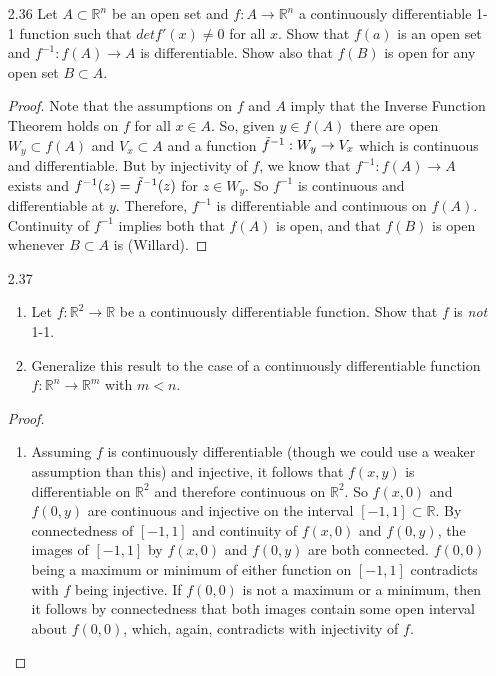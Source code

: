 \begin{enumerate}
    \item[2.36] Let \( A \subset \mathbb{R}^n \) be an open set and \( f: A \rightarrow \mathbb{R}^n \) a continuously differentiable 1-1 function such that \( det f'(x) \neq 0 \) for all \( x \). Show that \( f(a) \) is an open set and \( f^{-1}:f(A) \rightarrow A \) is differentiable. Show also that \( f(B) \) is open for any open set \( B \subset A \).
    
    \begin{proof}
    Note that the assumptions on \( f \) and \( A \) imply that the Inverse Function Theorem holds on \( f \) for all \( x \in A \). So, given \( y \in f(A) \) there are open \( W_y \subset f(A) \) and \( V_x \subset A \) and a function \( \Tilde{f}^{-1}: W_y \rightarrow V_x \) which is continuous and differentiable. But by injectivity of \( f \), we know that \( f^{-1}: f(A) \rightarrow A \) exists and \( f^{-1}(z) = \Tilde{f}^{-1}(z) \) for \( z \in W_y \). So \( f^{-1} \) is continuous and differentiable at \( y \). Therefore, \( f^{-1} \) is differentiable and continuous on \( f(A) \). Continuity of \( f^{-1} \) implies both that \( f(A) \) is open, and that \( f(B) \) is open whenever \( B \subset A \) is (Willard).
    \end{proof}
    
    \item[2.37]
    \begin{enumerate}
        \item Let \( f: \mathbb{R}^2 \rightarrow \mathbb{R} \) be a continuously differentiable function. Show that \( f \) is \emph{not} 1-1.
        
        \item Generalize this result to the case of a continuously differentiable function \( f: \mathbb{R}^n \rightarrow \mathbb{R}^m \) with \( m<n \).
    \end{enumerate}
    \begin{proof}
    \begin{enumerate}
        \item Assuming $f$ is continuously differentiable (though we could use a weaker assumption than this) and injective, it follows that $f(x,y)$ is differentiable on $\mathbb{R}^2$ and therefore continuous on $\mathbb{R}^2$. So $f(x,0)$ and $f(0,y)$ are continuous and injective on the interval $[-1,1]\subset \mathbb{R}$. By connectedness of $[-1,1]$ and continuity of $f(x,0)$ and $f(0,y)$, the images of $[-1,1]$ by $f(x,0)$ and $f(0,y)$ are both connected. $f(0,0)$ being a maximum or minimum of either function on $[-1,1]$ contradicts with $f$ being injective. If $f(0,0)$ is not a maximum or a minimum, then it follows by connectedness that both images contain some open interval about $f(0,0)$, which, again, contradicts with injectivity of $f$. 
        

\end{enumerate}
\end{proof}
\end{enumerate}
